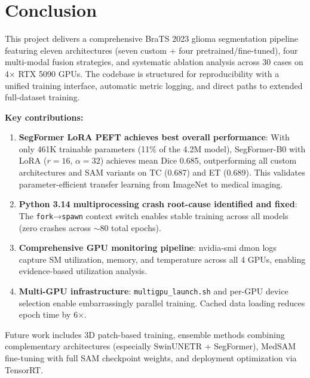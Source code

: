 \documentclass[11pt,a4paper]{article}
\begin{document}
\section{Conclusion}
This project delivers a comprehensive BraTS 2023 glioma segmentation pipeline featuring eleven architectures (seven custom + four pretrained/fine-tuned), four multi-modal fusion strategies, and systematic ablation analysis across 30 cases on 4$\times$ RTX 5090 GPUs. The codebase is structured for reproducibility with a unified training interface, automatic metric logging, and direct paths to extended full-dataset training.

\textbf{Key contributions:}
\begin{enumerate}
  \item \textbf{SegFormer LoRA PEFT achieves best overall performance}: With only 461K trainable parameters (11\% of the 4.2M model), SegFormer-B0 with LoRA ($r=16$, $\alpha=32$) achieves mean Dice 0.685, outperforming all custom architectures and SAM variants on TC (0.687) and ET (0.689). This validates parameter-efficient transfer learning from ImageNet to medical imaging.
  \item \textbf{Python 3.14 multiprocessing crash root-cause identified and fixed}: The \texttt{fork}→\texttt{spawn} context switch enables stable training across all models (zero crashes across $\sim$80 total epochs).
  \item \textbf{Comprehensive GPU monitoring pipeline}: nvidia-smi dmon logs capture SM utilization, memory, and temperature across all 4 GPUs, enabling evidence-based utilization analysis.
  \item \textbf{Multi-GPU infrastructure}: \texttt{multigpu\_launch.sh} and per-GPU device selection enable embarrassingly parallel training. Cached data loading reduces epoch time by 6$\times$.
\end{enumerate}

Future work includes 3D patch-based training, ensemble methods combining complementary architectures (especially SwinUNETR + SegFormer), MedSAM fine-tuning with full SAM checkpoint weights, and deployment optimization via TensorRT.
\end{document}
